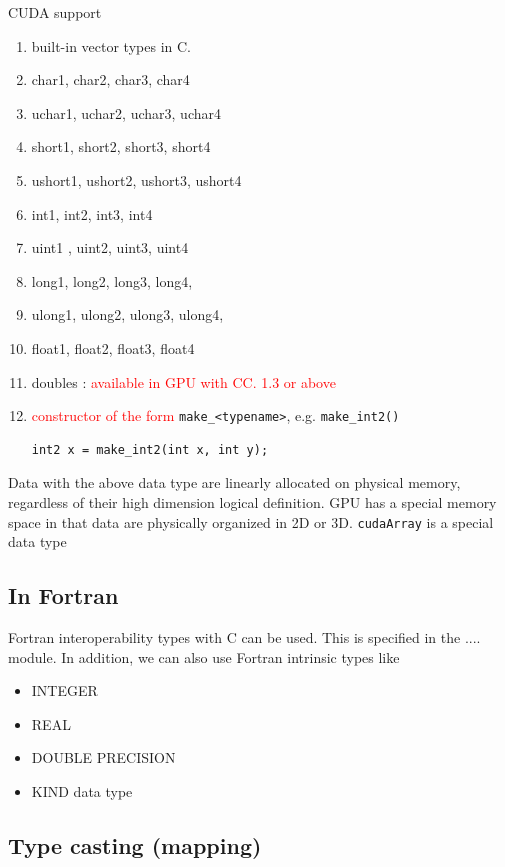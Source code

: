 CUDA support 
\begin{enumerate}
\item built-in vector types in C. 
\item char1, char2, char3, char4
\item uchar1, uchar2, uchar3, uchar4
\item short1, short2, short3, short4
\item ushort1, ushort2, ushort3, ushort4
\item int1, int2, int3, int4
\item uint1 , uint2, uint3, uint4
\item long1, long2, long3, long4,
\item ulong1, ulong2, ulong3, ulong4,
\item float1, float2, float3, float4
\item doubles :
  \textcolor{red}{available in GPU with CC. 1.3 or above}
\item \textcolor{red}{constructor of the form} \verb!make_<typename>!,
  e.g. \verb!make_int2()!
\begin{lstlisting}
int2 x = make_int2(int x, int y);
\end{lstlisting}
\end{enumerate}
Data with the above data type are linearly allocated on physical
memory, regardless of their high dimension logical definition. GPU has
a special memory space in that data are physically organized in 2D or
3D. 
\verb!cudaArray! is a special data type 

\subsection{In Fortran}
\label{sec:fortran}

Fortran interoperability types with C can be used. This is specified
in the .... module. In addition, we can also use Fortran intrinsic
types like
\begin{itemize}
\item INTEGER
\item REAL
\item DOUBLE PRECISION
\item KIND data type
\end{itemize}

\subsection{Type casting (mapping)}
\label{sec:type-casting-mapping}

